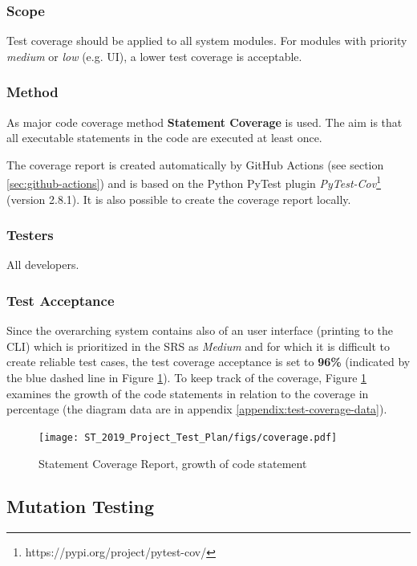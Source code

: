 \documentclass[a4paper]{article}
\begin{document}
\subsubsection*{Scope}
Test coverage should be applied to all system modules. For modules with priority \textit{medium} or \textit{low} (e.g. UI), a lower test coverage is acceptable.

\subsubsection*{Method}
As major code coverage method \textbf{Statement Coverage} is used. The aim is that all executable statements in the code are executed at least once. 

The coverage report is created automatically by GitHub Actions (see section \ref{sec:github-actions}) and is based on the Python PyTest plugin \textit{PyTest-Cov}\footnote{https://pypi.org/project/pytest-cov/} (version 2.8.1). It is also possible to create the coverage report locally.



\subsubsection*{Testers}
All developers.

\subsubsection*{Test Acceptance}
Since the overarching system contains also of an user interface (printing to the CLI) which is prioritized in the SRS as \textit{Medium} and for which it is difficult to create reliable test cases, the test coverage acceptance is set to \textbf{96\%} (indicated by the blue dashed line in Figure \ref{fig:coverage}). To keep track of the coverage, Figure \ref{fig:coverage} examines the growth of the code statements in relation to the coverage in percentage (the diagram data are in appendix \ref{appendix:test-coverage-data}).

\begin{figure}[H]
\centering
    \texttt{[image: ST\_2019\_Project\_Test\_Plan/figs/coverage.pdf]}
    \caption{Statement Coverage Report, growth of code statement}
    \label{fig:coverage}
\end{figure}



\clearpage
\subsection{Mutation Testing}
\end{document}
